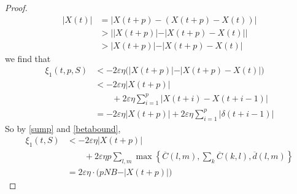 \begin{proof}
\begin{align*}
\vert X(t) \vert &= \vert X(t + p) - (X(t + p) - X(t)) \vert \\
&> \Big| | X(t + p) \vert - \vert  X(t + p) - X(t)   |  \Big| \\
&>  \vert X(t + p) \vert - \vert  X(t + p) - X(t)   \vert  
\end{align*}
we find that
\begin{align} \nonumber
\xi_1 (t,p,S) &< -2\varepsilon \eta \big( \vert X(t + p) \vert -  \vert  X(t + p) - X(t)   \vert \big)\\ \nonumber
&< -2\varepsilon \eta   \vert X(t + p) \vert \\  \nonumber
&\qquad + 2\varepsilon \eta\sum_{i=1}^{p} \vert  X(t + i) - X(t + i - 1)   \vert  \\ 
&= -2\varepsilon \eta   \vert X(t + p) \vert + 2\varepsilon \eta\sum_{i=1}^{p} \vert \delta(t + i -1) \vert 
\label{sump}
\end{align}
So by \eqref{sump} and \eqref{betabound}, 
\begin{align} \nonumber
\xi_1(t, S) &< -2\varepsilon \eta  \vert X(t + p) \vert \\ \nonumber
& \qquad + 2\varepsilon \eta  p \sum_{l,m} \max\left\{ \overline{C}(l,m),\sum_{k}\overline{C}(k,l),\overline d(l,m) \right\} \\ 
& = 2 \varepsilon \eta \cdot  \Big(pNB -  \vert X(t + p) \vert\Big) \label{xi1_bound}
\end{align}
%

\end{proof}

